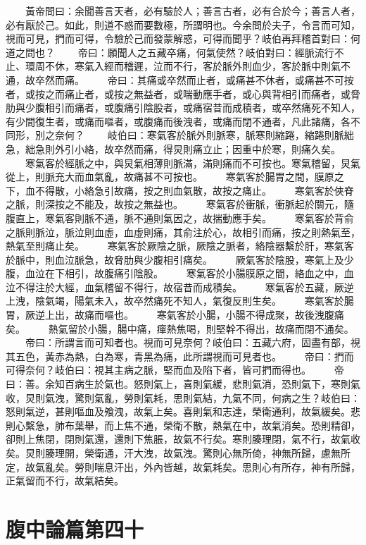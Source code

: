 　　黃帝問曰：余聞善言天者，必有驗於人；善言古者，必有合於今；善言人者，必有厭於己。如此，則道不惑而要數極，所謂明也。今余問於夫子，令言而可知，視而可見，捫而可得，令驗於己而發蒙解惑，可得而聞乎？岐伯再拜稽首對曰：何道之問也？
　　帝曰：願聞人之五藏卒痛，何氣使然？岐伯對曰：經脈流行不止、環周不休，寒氣入經而稽遲，泣而不行，客於脈外則血少，客於脈中則氣不通，故卒然而痛。
　　帝曰：其痛或卒然而止者，或痛甚不休者，或痛甚不可按者，或按之而痛止者，或按之無益者，或喘動應手者，或心與背相引而痛者，或脅肋與少腹相引而痛者，或腹痛引陰股者，或痛宿昔而成積者，或卒然痛死不知人，有少間復生者，或痛而嘔者，或腹痛而後洩者，或痛而閉不通者，凡此諸痛，各不同形，別之奈何？
　　岐伯曰：寒氣客於脈外則脈寒，脈寒則縮踡，縮踡則脈絀急，絀急則外引小絡，故卒然而痛，得炅則痛立止；因重中於寒，則痛久矣。
　　寒氣客於經脈之中，與炅氣相薄則脈滿，滿則痛而不可按也。寒氣稽留，炅氣從上，則脈充大而血氣亂，故痛甚不可按也。
　　寒氣客於腸胃之間，膜原之下，血不得散，小絡急引故痛，按之則血氣散，故按之痛止。
　　寒氣客於俠脊之脈，則深按之不能及，故按之無益也。
　　寒氣客於衝脈，衝脈起於關元，隨腹直上，寒氣客則脈不通，脈不通則氣因之，故揣動應手矣。
　　寒氣客於背俞之脈則脈泣，脈泣則血虛，血虛則痛，其俞注於心，故相引而痛，按之則熱氣至，熱氣至則痛止矣。
　　寒氣客於厥陰之脈，厥陰之脈者，絡陰器繫於肝，寒氣客於脈中，則血泣脈急，故脅肋與少腹相引痛矣。
　　厥氣客於陰股，寒氣上及少腹，血泣在下相引，故腹痛引陰股。
　　寒氣客於小腸膜原之間，絡血之中，血泣不得注於大經，血氣稽留不得行，故宿昔而成積矣。
　　寒氣客於五藏，厥逆上洩，陰氣竭，陽氣未入，故卒然痛死不知人，氣復反則生矣。
　　寒氣客於腸胃，厥逆上出，故痛而嘔也。
　　寒氣客於小腸，小腸不得成聚，故後洩腹痛矣。
　　熱氣留於小腸，腸中痛，癉熱焦喝，則堅幹不得出，故痛而閉不通矣。
　　帝曰：所謂言而可知者也。視而可見奈何？岐伯曰：五藏六府，固盡有部，視其五色，黃赤為熱，白為寒，青黑為痛，此所謂視而可見者也。
　　帝曰：捫而可得奈何？岐伯曰：視其主病之脈，堅而血及陷下者，皆可捫而得也。
　　帝曰：善。余知百病生於氣也。怒則氣上，喜則氣緩，悲則氣消，恐則氣下，寒則氣收，炅則氣洩，驚則氣亂，勞則氣耗，思則氣結，九氣不同，何病之生？岐伯曰：怒則氣逆，甚則嘔血及飧洩，故氣上矣。喜則氣和志達，榮衛通利，故氣緩矣。悲則心繫急，肺布葉舉，而上焦不通，榮衛不散，熱氣在中，故氣消矣。恐則精卻，卻則上焦閉，閉則氣還，還則下焦脹，故氣不行矣。寒則腠理閉，氣不行，故氣收矣。炅則腠理開，榮衛通，汗大洩，故氣洩。驚則心無所倚，神無所歸，慮無所定，故氣亂矣。勞則喘息汗出，外內皆越，故氣耗矣。思則心有所存，神有所歸，正氣留而不行，故氣結矣。


\section{腹中論篇第四十}

